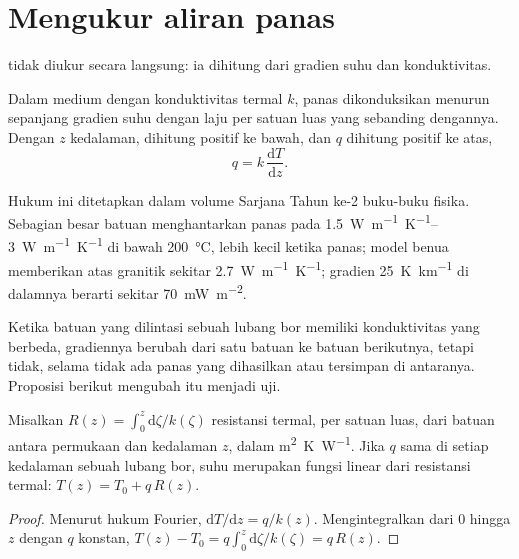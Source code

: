 \section{Mengukur aliran panas}

 tidak diukur secara langsung: ia dihitung dari gradien suhu dan konduktivitas.

\begin{proposition}\label{prop:b1:heat-budget:fourier}
Dalam medium dengan konduktivitas termal $k$, panas dikonduksikan menurun sepanjang gradien suhu dengan laju per satuan luas yang sebanding dengannya. Dengan $z$ kedalaman, dihitung positif ke bawah, dan $q$ dihitung positif ke atas,
\[
  q = k\,\frac{\mathrm dT}{\mathrm dz} .
\]
\end{proposition}
\admitted

Hukum ini ditetapkan dalam volume Sarjana Tahun ke-2 buku-buku fisika. Sebagian besar batuan menghantarkan panas pada \qtyrange{1.5}{3}{W.m^{-1}.K^{-1}} di bawah \qty{200}{\celsius}, lebih kecil ketika panas; model  benua memberikan  atas granitik sekitar \qty{2.7}{W.m^{-1}.K^{-1}};
gradien \qty{25}{K.km^{-1}} di dalamnya berarti  sekitar \qty{70}{mW.m^{-2}}.

Ketika batuan yang dilintasi sebuah lubang bor memiliki konduktivitas yang berbeda, gradiennya berubah dari satu batuan ke batuan berikutnya, tetapi  tidak, selama tidak ada panas yang dihasilkan atau tersimpan di antaranya. Proposisi berikut mengubah itu menjadi uji.

\begin{proposition}\label{prop:b1:heat-budget:bullard}
Misalkan $R(z) = \int_0^z \mathrm d\zeta/k(\zeta)$ resistansi termal, per satuan luas, dari batuan antara permukaan dan kedalaman $z$, dalam \unit{m^2.K.W^{-1}}. Jika  $q$ sama di setiap kedalaman sebuah lubang bor, suhu merupakan fungsi linear dari resistansi termal: $T(z) = T_0 + q\,R(z)$.
\end{proposition}

\begin{proof}
Menurut hukum Fourier, $\mathrm dT/\mathrm dz = q/k(z)$. Mengintegralkan dari $0$ hingga
$z$ dengan $q$ konstan, $T(z) - T_0 = q\int_0^z \mathrm d\zeta/k(\zeta) = q\,R(z)$.
\end{proof}

